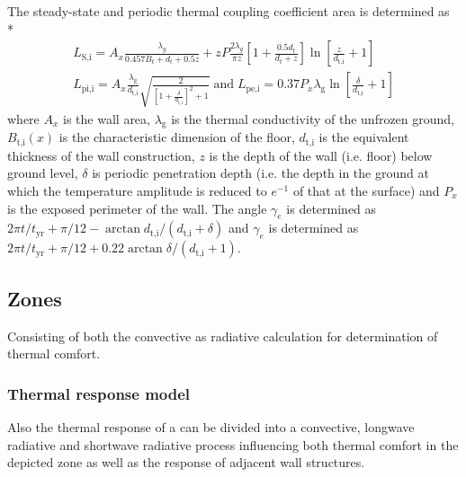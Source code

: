 The steady-state and periodic thermal coupling coefficient area is determined as \\*
\begin{gather}
L_{\textrm{S,i}} = A_{x} \frac{\lambda_{g}}{0.457 B_{t} + d_{t} + 0.5 z}+ z P \frac{2 \lambda_{g}}{\pi z} \left[1+\frac{0.5 d_{t}}{d_{t}+z}\right] \ln \left[\frac{z}{d_{\textrm{t,i}}}+1\right] \\
L_{\textrm{pi,i}} = A_{x} \frac{\lambda_{\textrm{g}}}{d_{\textrm{t,i}}} \sqrt{\frac{2}{\left[ 1 + \frac{\delta}{d_{\textrm{t,i}}}\right]^{2} +1}} \; \mbox{and} \;
L_{\textrm{pe,i}} = 0.37 P_{x} \lambda_{\textrm{g}} \ln{\left[\frac{\delta}{d_{\textrm{t,i}}} + 1\right]}
\end{gather}
where $A_{x}$ is the wall area, $\lambda_{\textrm{g}}$ is the thermal conductivity of the unfrozen ground, $B_{\textrm{t,i}}(x)$ is the characteristic dimension of the floor, $d_{\textrm{t,i}}$ is the equivalent thickness of the wall construction, $z$ is the depth of the wall (i.e. floor) below ground level, $\delta$ is periodic penetration depth (i.e. the depth in the ground at which the temperature amplitude is reduced to $e^{-1}$ of that at the surface) and $P_{x}$ is the exposed perimeter of the wall. The angle $\gamma_{e}$ is determined as $2 \pi t / t_{\textrm{yr}} + \pi / 12 - \arctan{d_{\textrm{t,i}} / \left( d_{\textrm{t,i}} + \delta \right)}$ and $\gamma_{e}$ is determined as $2 \pi t / t_{\textrm{yr}} + \pi / 12 + 0.22 \arctan{\delta / \left( d_{\textrm{t,i}} + 1 \right)}$.

\subsection{Zones}

Consisting of both the convective as radiative calculation for determination of thermal comfort.

\subsubsection{Thermal response model}

Also the thermal response of a  can be divided into a convective, longwave radiative and shortwave radiative process influencing both thermal comfort in the depicted zone as well as the response of adjacent wall structures.

